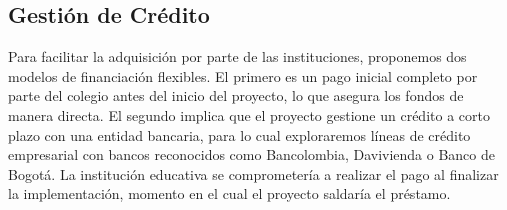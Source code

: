 \subsection*{Gestión de Crédito}
Para facilitar la adquisición por parte de las instituciones, proponemos dos 
modelos de financiación flexibles. El primero es un pago inicial completo por 
parte del colegio antes del inicio del proyecto, lo que asegura los fondos de 
manera directa. El segundo implica que el proyecto gestione un crédito a corto 
plazo con una entidad bancaria, para lo cual exploraremos líneas de crédito 
empresarial con bancos reconocidos como Bancolombia, Davivienda o Banco de 
Bogotá. La institución educativa se comprometería a realizar el pago al 
finalizar la implementación, momento en el cual el proyecto saldaría el 
préstamo.

